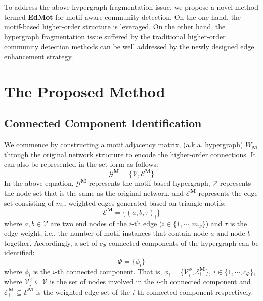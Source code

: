 \documentclass[sigconf]{acmart}
\begin{document}
To address the above hypergraph fragmentation issue, we propose a novel method termed \textbf{EdMot} for motif-aware community detection. On the one hand, the motif-based higher-order structure is leveraged. On the other hand, the hypergraph fragmentation issue suffered by the traditional higher-order community detection methods can be well addressed by the newly designed edge enhancement strategy.



\section{The Proposed Method}




\subsection{Connected Component Identification}
We commence by constructing a motif adjacency matrix, (a.k.a. hypergraph) $W_{\mathbf{M}}$ through the original network structure to encode the higher-order connections. It can also be represented in the set form as follows:
\begin{equation}
\label{eq:GMotif}
\mathcal{G}^{\mathbf{M}} = \{\mathcal{V},\mathcal{E}^{\mathbf{M}} \}
\end{equation}
In the above equation, $\mathcal{G}^{\mathbf{M}}$ represents the motif-based hypergraph, $\mathcal{V}$ represents the node set that is the same as the original network, and $\mathcal{E}^{\mathbf{M}}$ represents the edge set consisting of $m_{w}$ weighted edges generated based on triangle motifs:
\begin{equation}
\label{eq:motifEdge}
\mathcal{E}^{\mathbf{M}} = \{(a,b,\tau)_{i}\}
\end{equation}
where $a,b\in \mathcal{V}$ are two end nodes of the $i$-th edge ($i \in \{1,\cdots, m_{w}\}$) and $\tau$ is the edge weight, i.e., the number of motif instances that contain node $a$ and node $b$ together. Accordingly, a set of $c_{\Phi}$ connected components of the hypergraph can be identified:
\begin{equation}
\label{eq:concomponents}
\Phi = \{ \phi_{i}\}
\end{equation}
where $\phi_{i}$ is the $i$-th connected component. That is, $\phi_{i} = \{\mathcal{V}^{\phi}_{i}, \mathcal{E}^{\mathbf{M}}_{i} \}$, $i \in \{1, \cdots,c_{\Phi}\}$, where $\mathcal{V}^{\phi}_{i}\subseteq \mathcal{V}$ is the set of nodes involved in the $i$-th connected component and $\mathcal{E}^{\mathbf{M}}_{i}\subseteq\mathcal{E}^{\mathbf{M}}$ is the weighted edge set of the $i$-th connected component respectively.
\end{document}
